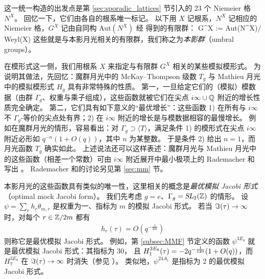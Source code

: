 这一统一构造的出发点是第 \ref{sec:sporadic_lattices} 节引入的 23 个 Niemeier 格 $N^X$。
回忆一下，它们由各自的根系唯一标记。
以下用 $X$ 记根系，$N^X$ 记相应的 Niemeier 格，$G^X$ 记由自同构 Aut$(N^X)$ 经  得到的有限群：
\be\label{eqn:def_um_grp}
G^X := {\rm Aut}(N^X)/ {\rm Weyl}(X)
\ee
这些就是与本影月光相关的有限群，我们称之为\emph{本影群}（umbral groups）。


在模形式这一侧，我们用根系 $X$ 来指定与有限群 $G^X$ 相关的某些模拟模形式。
为说明其做法，先回忆：魔群月光中的 McKay--Thompson 级数 $T_g$ 与 Mathieu 月光中的模拟模形式 $H_g$ 具有非常特殊的性质。
第一，一旦给定它们的（模拟）模数据（由群 $\Gamma_g$、权重与乘子组成），这些函数就被它们在尖点 $i\infty\cup \mathbb{Q}$ 附近的增长性质完全确定。
第二，它们具有如下意义的“最优增长”：这些函数 1) 在所有与 $i\infty$ 不 $\Gamma_g$-等价的尖点处有界；2) 在 $i\infty$ 附近的增长是与模数据相容的最慢增长。
例如在魔群月光的情形，容易看出：对 $\Gamma_g\supset \langle T \rangle$，满足条件 1) 的模形式在尖点 $i\infty$ 附近必形如 $q^{-n}(1+ O(q))$，其中 $n$ 为某整数。
于是条件 2) 给出 $n=1$，而月光函数 $T_g$ 确实如此。
上述说法还可以这样表述：魔群月光与 Mathieu 月光中的这些函数（相差一个常数）可由 $i\infty$ 附近展开中最小极项上的 Rademacher 和写出 \cite{DunFre_RSMG,cheng2012rademacher}。
Rademacher 和的讨论另见第 \ref{sec:mm} 节。


本影月光的这些函数具有类似的唯一性，这里相关的概念是\emph{最优模拟 Jacobi 形式}（optimal mock Jacobi form）。
我们先考虑 $g=e$、$\Gamma_g = \operatorname{\textsl{SL}}_2(\mathbb{Z})$ 的情形。
设 $\psi=\sum_r h_r\theta_{m,r}$ 是权重为一、指标为 $m$ 的模拟 Jacobi 形式。
若当 $\Im(\tau)\to \infty$ 时，对每个 $r\in\mathbb{Z}/2m$ 都有
\begin{gather}\label{eqn:intro:opt}
h_r(\tau)=O(q^{-\frac1{4m}})
\end{gather} 
则称它是最优模拟 Jacobi 形式。
例如，第 \ref{subsec:MMF} 节定义的函数 $\psi^{3E_8}$ 就是最优模拟 Jacobi 形式：其指标为 30，
且 $H_1^{3E_8}(\tau)= -2q^{-{1\over120}}( 1+O(q))$，而 $H_7^{3E_8}$ 在 $\Im(\tau)\to \infty$ 时消失（参见 ）。
类似地，$\psi^{24A_1}$ 是指标为 2 的最优模拟 Jacobi 形式。

